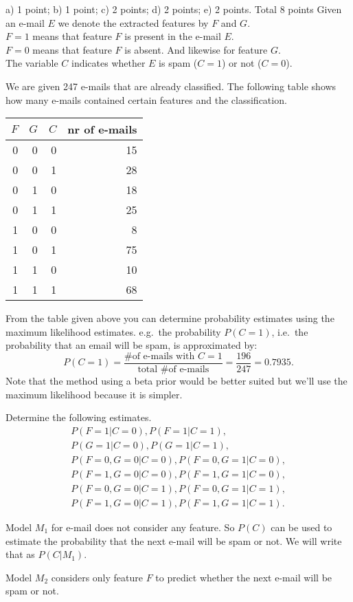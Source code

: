 \documentclass[a4paper]{article}
\begin{document}
\begin{exam}
\begin{vraag}{a) 1 point; b) 1 point; c) 2 points; d) 2 points; e) 2 points. Total 8 points}
Given an e-mail $E$ we denote the extracted features by $F$ and $G$.\\
$F=1$ means that feature $F$ is present in the e-mail $E$.\\
$F=0$ means that feature $F$ is absent. And likewise for feature $G$.\\
The variable $C$ indicates whether $E$ is spam ($C=1$) or not ($C=0$).

We are given 247 e-mails that are already classified. The following table shows how many e-mails contained certain features and the classification.
\begin{center}
  \begin{tabular}{rrr|r}
  $F$ & $G$ & $C$ & nr of e-mails \\
  \hline
  0 & 0 & 0 & 15 \\
  0 & 0 & 1 & 28 \\
  0 & 1 & 0 & 18 \\
  0 & 1 & 1 & 25 \\
  1 & 0 & 0 &  8 \\
  1 & 0 & 1 & 75 \\
  1 & 1 & 0 & 10 \\
  1 & 1 & 1 & 68
  \end{tabular}
\end{center}
\begin{deelvraag}
From the table given above you can determine probability estimates using the maximum likelihood estimates. e.g.\ the probability $P(C=1)$, i.e.\ the probability that an email will be spam, is approximated by:
\[ P(C=1) = \frac{\text{\# of e-mails with }C=1}{\text{total \# of e-mails}} =
   \frac{196}{247}=0.7935.
\]
Note that the method using a beta prior would be better suited but we'll use the maximum likelihood
because it is simpler.

Determine the following estimates.
\begin{gather*}
  P(F=1|C=0), P(F=1|C=1), \\ P(G=1|C=0), P(G=1|C=1), \\
  P(F=0,G=0|C=0), P(F=0,G=1|C=0), \\ P(F=1,G=0|C=0), P(F=1,G=1|C=0), \\
  P(F=0,G=0|C=1), P(F=0,G=1|C=1), \\ P(F=1,G=0|C=1), P(F=1,G=1|C=1).
\end{gather*}
\end{deelvraag}
%
Model $M_1$ for e-mail does not consider any feature. So $P(C)$ can be used to estimate the probability that the next e-mail will be spam or not. We will write that as $P(C|M_1)$.\\
\begin{deelvraag}
  Model $M_2$ considers only feature $F$ to predict whether the next e-mail will be spam or not.
  

\end{deelvraag}
\end{vraag}
\end{exam}
\end{document}
